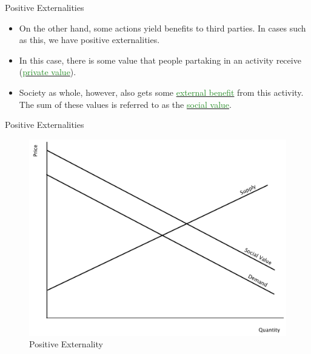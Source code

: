 \documentclass[xcolor={dvipsnames},pdf, hyperref={colorlinks=true, citecolor=ForestGreen, linkcolor=BlueViolet, urlcolor=Magenta}]{beamer}
\newcommand{\dd}[1]{{\underline{\textcolor{ForestGreen}{#1}}}}
\begin{document}
\begin{frame}{Positive Externalities}
	\begin{itemize}
		\item 	On the other hand, some actions yield benefits to third parties. In cases such as this, we have positive externalities.
		\item In this case, there is some value that people partaking in an activity receive (\dd{private value}).
		\item Society as whole, however, also gets some \dd{external benefit} from this activity. The sum of these values is referred to as the \dd{social value}. 
	\end{itemize}
\end{frame}

\begin{frame}[b]{Positive Externalities}

	\begin{figure}[H]
		\centering
		\includegraphics[scale=.35]{plot52.pdf}
		\caption{Positive Externality}
	\end{figure}
\end{frame}
\end{document}
